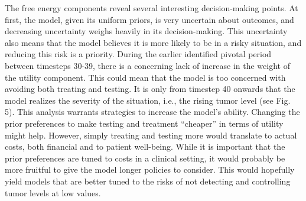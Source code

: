 \documentclass[
]{article}
\begin{document}
The free energy components reveal several interesting decision-making
points. At first, the model, given its uniform priors, is very uncertain
about outcomes, and decreasing uncertainty weighs heavily in its
decision-making. This uncertainty also means that the model believes it
is more likely to be in a risky situation, and reducing this risk is a
priority. During the earlier identified pivotal period between timesteps
30-39, there is a concerning lack of increase in the weight of the
utility component. This could mean that the model is too concerned with
avoiding both treating and testing. It is only from timestep 40 onwards
that the model realizes the severity of the situation, i.e., the rising
tumor level (see Fig. 5). This analysis warrants strategies to increase
the model's ability. Changing the prior preferences to make testing and
treatment ``cheaper'' in terms of utility might help. However, simply
treating and testing more would translate to actual costs, both
financial and to patient well-being. While it is important that the
prior preferences are tuned to costs in a clinical setting, it would
probably be more fruitful to give the model longer policies to consider.
This would hopefully yield models that are better tuned to the risks of
not detecting and controlling tumor levels at low values.
\end{document}
